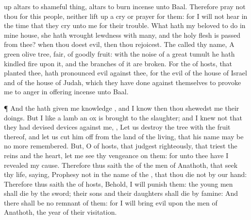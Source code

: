 {up
altars to
{} shameful
thing,
{}
altars to burn
incense unto
Baal.
Therefore
pray not thou for this
people, neither lift
up a
cry or
prayer for them: for I will not
hear
{} in the
time that they
cry unto me for their
trouble.
What hath my
beloved to do in mine
house,
{} she hath
wrought
lewdness with
many, and the
holy
flesh is
passed from thee? when thou doest
evil, then thou
rejoicest.
The
{}
called thy
name, A
green olive
tree,
fair,
{} of
goodly
fruit: with the
noise of a
great
tumult he hath
kindled
fire upon it, and the
branches of it are
broken.
For the
{} of
hosts, that
planted thee, hath
pronounced
evil against thee,
for the
evil of the
house of
Israel and of the
house of
Judah, which they have
done against themselves to provoke me to
anger in offering
incense unto
Baal.
\par }{\PP {}¶ And the
{} hath given me
knowledge
{}, and I
know
{} then thou
shewedst me their
doings.
But I
{} like a
lamb
{} an
ox
{} is
brought to the
slaughter; and I
knew not that they had
devised
devices against me,
{}, Let us
destroy the
tree with the
fruit thereof, and let us cut him
off from the
land of the
living, that his
name may be no more
remembered.
But, O
{} of
hosts, that
judgest
righteously, that
triest the
reins and the
heart, let me
see thy
vengeance on them: for unto thee have I
revealed my
cause.
Therefore thus
saith the
{} of the
men of
Anathoth, that
seek thy
life,
saying,
Prophesy not in the
name of the
{}, that thou
die not by our
hand:
Therefore thus
saith the
{} of
hosts, Behold, I will
punish them: the young
men shall
die by the
sword; their
sons and their
daughters shall
die by
famine:
And there shall be no
remnant of them: for I will
bring
evil upon the
men of
Anathoth,
{} the
year of their
visitation.

}
